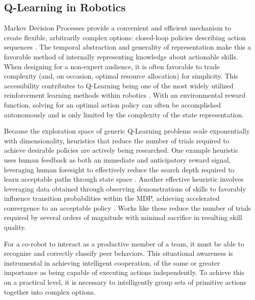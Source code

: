 \documentclass[letterpaper]{article}
\begin{document}
\subsection{Q-Learning in Robotics}
  Markov Decision Processes provide a convenient and efficient mechanism to create flexible, arbitrarily complex options: closed-loop policies describing action sequences \cite{SuttonMDP}. The temporal abstraction and generality of representation make this a favorable method of internally representing knowledge about actionable skills. When designing for a non-expert audience, it is often favorable to trade complexity (and, on occasion, optimal resource allocation) for simplicity. This accessibility contributes to Q-Learning being one of the most widely utilized reinforcement learning methods within robotics \cite{QLearningWatkins}. With an environmental reward function, solving for an optimal action policy can often be accomplished autonomously and is only limited by the complexity of the state representation.

  Because the exploration space of generic Q-Learning problems scale exponentially with dimensionality, heuristics that reduce the number of trials required to achieve desirable policies are actively being researched. One example heuristic uses human feedback as both an immediate and anticipatory reward signal, leveraging human foresight to effectively reduce the search depth required to learn acceptable paths through state space \cite{TAMER}. Another effective heuristic involves leveraging data obtained through observing demonstrations of skills to favorably influence transition probabilities within the MDP, achieving accelerated convergence to an acceptable policy \cite{LFDSurvey}. Works like these reduce the number of trials required by several orders of magnitude with minimal sacrifice in resulting skill quality.

  For a co-robot to interact as a productive member of a team, it must be able to recognize and correctly classify peer behaviors. This situational awareness is instrumental in achieving intelligent cooperation, of the same or greater importance as being capable of executing actions independently. To achieve this on a practical level, it is necessary to intelligently group sets of primitive actions together into complex options. 
\end{document}
